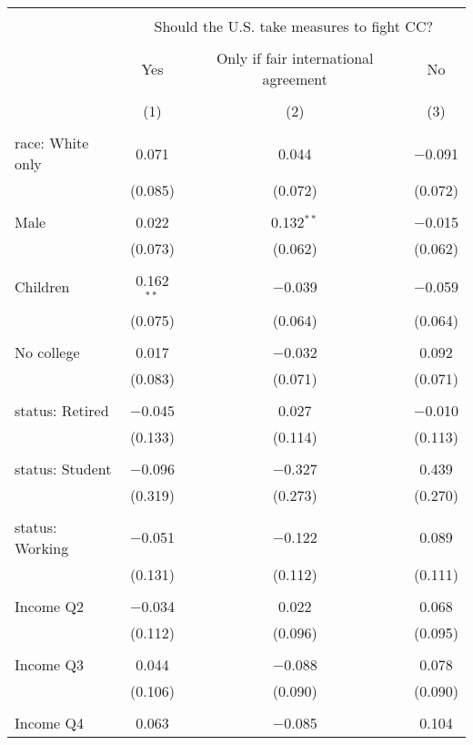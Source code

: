 
\begin{tabular}{@{\extracolsep{5pt}}lccc} 
\\[-1.8ex]\hline 
\hline \\[-1.8ex] 
 & \multicolumn{3}{c}{Should the U.S. take measures to fight CC?} \\ 
\cline{2-4} 
\\[-1.8ex] & Yes & Only if fair international agreement & No \\ 
\\[-1.8ex] & (1) & (2) & (3)\\ 
\hline \\[-1.8ex] 
 race: White only & 0.071 & 0.044 & $-$0.091 \\ 
  & (0.085) & (0.072) & (0.072) \\ 
  & & & \\ 
 Male & 0.022 & 0.132$^{**}$ & $-$0.015 \\ 
  & (0.073) & (0.062) & (0.062) \\ 
  & & & \\ 
 Children & 0.162$^{**}$ & $-$0.039 & $-$0.059 \\ 
  & (0.075) & (0.064) & (0.064) \\ 
  & & & \\ 
 No college & 0.017 & $-$0.032 & 0.092 \\ 
  & (0.083) & (0.071) & (0.071) \\ 
  & & & \\ 
 status: Retired & $-$0.045 & 0.027 & $-$0.010 \\ 
  & (0.133) & (0.114) & (0.113) \\ 
  & & & \\ 
 status: Student & $-$0.096 & $-$0.327 & 0.439 \\ 
  & (0.319) & (0.273) & (0.270) \\ 
  & & & \\ 
 status: Working & $-$0.051 & $-$0.122 & 0.089 \\ 
  & (0.131) & (0.112) & (0.111) \\ 
  & & & \\ 
 Income Q2 & $-$0.034 & 0.022 & 0.068 \\ 
  & (0.112) & (0.096) & (0.095) \\ 
  & & & \\ 
 Income Q3 & 0.044 & $-$0.088 & 0.078 \\ 
  & (0.106) & (0.090) & (0.090) \\ 
  & & & \\ 
 Income Q4 & 0.063 & $-$0.085 & 0.104 \\ 

\end{tabular}
